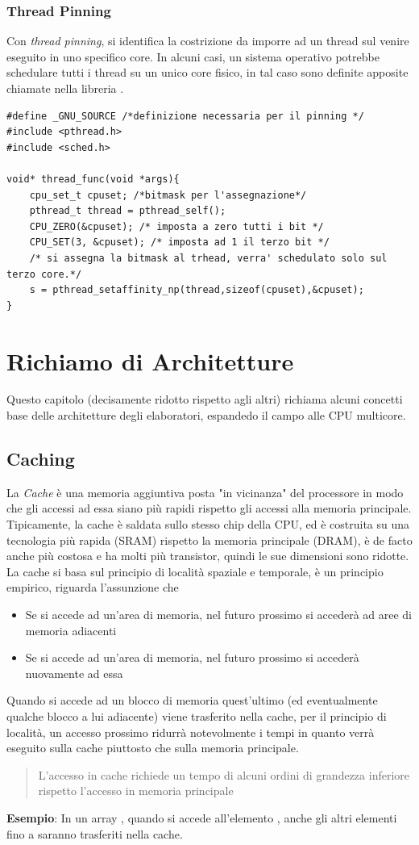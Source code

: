 \documentclass[10pt, letterpaper]{report}
\begin{document}
\subsection{Thread Pinning}
Con \textit{thread pinning}, si identifica la costrizione da imporre ad un thread sul venire eseguito in uno specifico core. In alcuni casi, un sistema operativo potrebbe schedulare tutti i thread su un unico core fisico, in tal caso sono definite apposite chiamate nella libreria .
\begin{lstlisting}[style=CStyle]
#define _GNU_SOURCE /*definizione necessaria per il pinning */
#include <pthread.h> 
#include <sched.h> 

void* thread_func(void *args){
    cpu_set_t cpuset; /*bitmask per l'assegnazione*/
    pthread_t thread = pthread_self(); 
    CPU_ZERO(&cpuset); /* imposta a zero tutti i bit */
    CPU_SET(3, &cpuset); /* imposta ad 1 il terzo bit */
    /* si assegna la bitmask al trhead, verra' schedulato solo sul terzo core.*/
    s = pthread_setaffinity_np(thread,sizeof(cpuset),&cpuset);
}
\end{lstlisting}
\chapter{Richiamo di Architetture}
Questo capitolo (decisamente ridotto rispetto agli altri) richiama alcuni concetti base delle architetture degli elaboratori, espandedo il campo alle CPU multicore.
\section{Caching}
La \textit{Cache} è una memoria aggiuntiva posta "in vicinanza" del processore in modo che gli accessi ad essa siano più rapidi rispetto gli accessi alla memoria principale. Tipicamente, la cache è saldata sullo stesso chip della CPU, ed è costruita su una tecnologia più rapida (SRAM) rispetto la memoria principale (DRAM), è de facto anche più costosa e ha molti più transistor, quindi le sue dimensioni sono ridotte.\acc 
La cache si basa sul principio di località spaziale e temporale, è un principio empirico, riguarda l'assunzione che\begin{itemize}
    \item Se si accede ad un'area di memoria, nel futuro prossimo si accederà ad aree di memoria adiacenti 
    \item Se si accede ad un'area di memoria, nel futuro prossimo si accederà nuovamente ad essa 
\end{itemize}
Quando si accede ad un blocco di memoria quest'ultimo (ed eventualmente qualche blocco a lui adiacente) viene trasferito nella cache, per il principio di località, un accesso prossimo ridurrà notevolmente i tempi in quanto verrà eseguito sulla cache piuttosto che sulla memoria principale.\begin{quotation}
    L'accesso in cache richiede un tempo di alcuni ordini di grandezza inferiore rispetto l'accesso in memoria principale
\end{quotation}
\textbf{Esempio}: In un array , quando si accede all'elemento , anche gli altri elementi fino a  saranno trasferiti nella cache.
\end{document}
